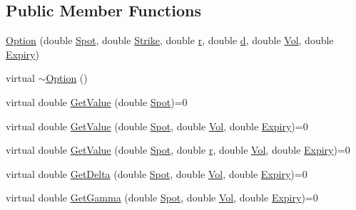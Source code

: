 \subsection*{Public Member Functions}
\begin{DoxyCompactItemize}
\item 
\hyperlink{classMyOption_1_1Option_af0a5ceb0b3d55be89aeb858a9628cac2}{Option} (double \hyperlink{classMyOption_1_1Option_a6c6f01d75cde7e92d16a6d8d6f331a1d}{Spot}, double \hyperlink{classMyOption_1_1Option_a3033c483588ce26b175280c7f9dee8d1}{Strike}, double \hyperlink{classMyOption_1_1Option_aa8cb250427dece65ea49255d4102cc8d}{r}, double \hyperlink{classMyOption_1_1Option_a500979f4b32262594d895c4a83b58d1d}{d}, double \hyperlink{classMyOption_1_1Option_a5d6002c14b335c782873bf1437113513}{Vol}, double \hyperlink{classMyOption_1_1Option_ac1adacb417fede41d151b9cda05bcb3d}{Expiry})
\item 
virtual \hyperlink{classMyOption_1_1Option_a628fa8400b2ff4d8dbb71fb17b8b9d07}{$\sim$\+Option} ()
\item 
virtual double \hyperlink{classMyOption_1_1Option_aff32b402a5e44fca9e5a22a142fbbdd6}{Get\+Value} (double \hyperlink{classMyOption_1_1Option_a6c6f01d75cde7e92d16a6d8d6f331a1d}{Spot})=0
\item 
virtual double \hyperlink{classMyOption_1_1Option_a78fa248dcb939e0ebaefbb944d5d9cf8}{Get\+Value} (double \hyperlink{classMyOption_1_1Option_a6c6f01d75cde7e92d16a6d8d6f331a1d}{Spot}, double \hyperlink{classMyOption_1_1Option_a5d6002c14b335c782873bf1437113513}{Vol}, double \hyperlink{classMyOption_1_1Option_ac1adacb417fede41d151b9cda05bcb3d}{Expiry})=0
\item 
virtual double \hyperlink{classMyOption_1_1Option_a62422d3dc60eabe65cfa94d2a452f5f8}{Get\+Value} (double \hyperlink{classMyOption_1_1Option_a6c6f01d75cde7e92d16a6d8d6f331a1d}{Spot}, double \hyperlink{classMyOption_1_1Option_aa8cb250427dece65ea49255d4102cc8d}{r}, double \hyperlink{classMyOption_1_1Option_a5d6002c14b335c782873bf1437113513}{Vol}, double \hyperlink{classMyOption_1_1Option_ac1adacb417fede41d151b9cda05bcb3d}{Expiry})=0
\item 
virtual double \hyperlink{classMyOption_1_1Option_a4947bde99bb5e46b79aa0f36fd353d9b}{Get\+Delta} (double \hyperlink{classMyOption_1_1Option_a6c6f01d75cde7e92d16a6d8d6f331a1d}{Spot}, double \hyperlink{classMyOption_1_1Option_a5d6002c14b335c782873bf1437113513}{Vol}, double \hyperlink{classMyOption_1_1Option_ac1adacb417fede41d151b9cda05bcb3d}{Expiry})=0
\item 
virtual double \hyperlink{classMyOption_1_1Option_a4416faa432b5004e449394056c7f1363}{Get\+Gamma} (double \hyperlink{classMyOption_1_1Option_a6c6f01d75cde7e92d16a6d8d6f331a1d}{Spot}, double \hyperlink{classMyOption_1_1Option_a5d6002c14b335c782873bf1437113513}{Vol}, double \hyperlink{classMyOption_1_1Option_ac1adacb417fede41d151b9cda05bcb3d}{Expiry})=0

\end{DoxyCompactItemize}
